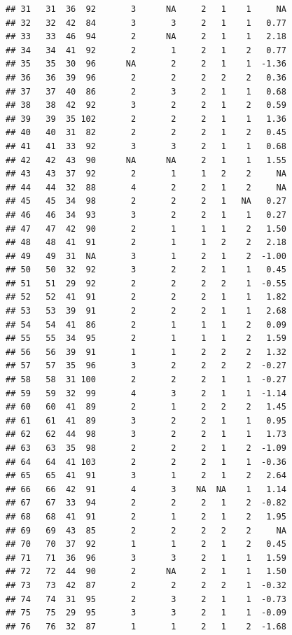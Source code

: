 \documentclass[
]{book}
\begin{document}
\begin{verbatim}
## 31   31  36  92       3      NA     2   1    1     NA
## 32   32  42  84       3       3     2   1    1   0.77
## 33   33  46  94       2      NA     2   1    1   2.18
## 34   34  41  92       2       1     2   1    2   0.77
## 35   35  30  96      NA       2     2   1    1  -1.36
## 36   36  39  96       2       2     2   2    2   0.36
## 37   37  40  86       2       3     2   1    1   0.68
## 38   38  42  92       3       2     2   1    2   0.59
## 39   39  35 102       2       2     2   1    1   1.36
## 40   40  31  82       2       2     2   1    2   0.45
## 41   41  33  92       3       3     2   1    1   0.68
## 42   42  43  90      NA      NA     2   1    1   1.55
## 43   43  37  92       2       1     1   2    2     NA
## 44   44  32  88       4       2     2   1    2     NA
## 45   45  34  98       2       2     2   1   NA   0.27
## 46   46  34  93       3       2     2   1    1   0.27
## 47   47  42  90       2       1     1   1    2   1.50
## 48   48  41  91       2       1     1   2    2   2.18
## 49   49  31  NA       3       1     2   1    2  -1.00
## 50   50  32  92       3       2     2   1    1   0.45
## 51   51  29  92       2       2     2   2    1  -0.55
## 52   52  41  91       2       2     2   1    1   1.82
## 53   53  39  91       2       2     2   1    1   2.68
## 54   54  41  86       2       1     1   1    2   0.09
## 55   55  34  95       2       1     1   1    2   1.59
## 56   56  39  91       1       1     2   2    2   1.32
## 57   57  35  96       3       2     2   2    2  -0.27
## 58   58  31 100       2       2     2   1    1  -0.27
## 59   59  32  99       4       3     2   1    1  -1.14
## 60   60  41  89       2       1     2   2    2   1.45
## 61   61  41  89       3       2     2   1    1   0.95
## 62   62  44  98       3       2     2   1    1   1.73
## 63   63  35  98       2       2     2   1    2  -1.09
## 64   64  41 103       2       2     2   1    1  -0.36
## 65   65  41  91       3       1     2   1    2   2.64
## 66   66  42  91       4       3    NA  NA    1   1.14
## 67   67  33  94       2       2     2   1    2  -0.82
## 68   68  41  91       2       1     2   1    2   1.95
## 69   69  43  85       2       2     2   2    2     NA
## 70   70  37  92       1       1     2   1    2   0.45
## 71   71  36  96       3       3     2   1    1   1.59
## 72   72  44  90       2      NA     2   1    1   1.50
## 73   73  42  87       2       2     2   2    1  -0.32
## 74   74  31  95       2       3     2   1    1  -0.73
## 75   75  29  95       3       3     2   1    1  -0.09
## 76   76  32  87       1       1     2   1    2  -1.68

\end{verbatim}
\end{document}
